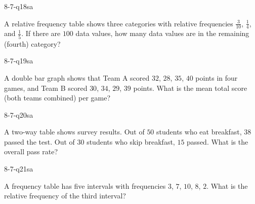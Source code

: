 \begin{practiceQuestion}{8-7-q18}{sa}
\begin{questionText}
A relative frequency table shows three categories with relative frequencies $\frac{3}{10}$, $\frac{1}{4}$, and $\frac{1}{5}$. If there are $100$ data values, how many data values are in the remaining (fourth) category?
\end{questionText}
\end{practiceQuestion}

\begin{practiceQuestion}{8-7-q19}{sa}
\begin{questionText}
A double bar graph shows that Team A scored $32$, $28$, $35$, $40$ points in four games, and Team B scored $30$, $34$, $29$, $39$ points. What is the mean total score (both teams combined) per game?
\end{questionText}
\end{practiceQuestion}

\begin{practiceQuestion}{8-7-q20}{sa}
\begin{questionText}
A two-way table shows survey results. Out of $50$ students who eat breakfast, $38$ passed the test. Out of $30$ students who skip breakfast, $15$ passed. What is the overall pass rate?
\end{questionText}
\end{practiceQuestion}

\begin{practiceQuestion}{8-7-q21}{sa}
\begin{questionText}
A frequency table has five intervals with frequencies $3$, $7$, $10$, $8$, $2$. What is the relative frequency of the third interval?
\end{questionText}
\end{practiceQuestion}

